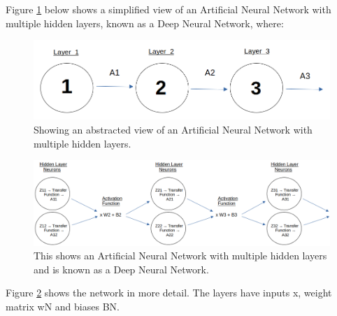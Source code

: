 \documentclass[./project-report/src/latex/project-report.tex]{subfiles}
\begin{document}
Figure \ref{fig:abstract-network} below shows a simplified view of an Artificial Neural Network with multiple hidden layers, known as a Deep Neural Network, where:

\pagebreak

\begin{figure}[h!]
\centering
\includegraphics[width=1\textwidth]{./project-report/src/images/deep-ann-diagram.png}
\caption{Showing an abstracted view of an Artificial Neural Network with multiple hidden layers.}
\label{fig:abstract-network}
\end{figure}

\begin{figure}[h!]
\centering
\includegraphics[width=1\textwidth]{./project-report/src/images/deep-ann-diagram-2.png}
\caption{This shows an Artificial Neural Network with multiple hidden layers and is known as a Deep Neural Network.}
\label{fig:abstract-network2}
\end{figure}

Figure \ref{fig:abstract-network2} shows the network in more detail. The layers have inputs x, weight matrix wN and biases BN.
\end{document}
